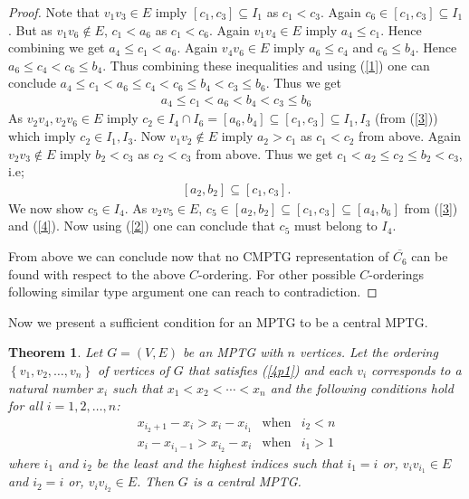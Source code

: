\documentclass{article}
\newtheorem{thm}{Theorem}[section]
\theoremstyle{definition}
\numberwithin{equation}{section}
\newcommand{\set}[1]{\left\{#1\right\}}
\begin{document}
\begin{proof}
\noindent 
Note that $v_{1}v_{3}\in E$ imply $[c_{1},c_{3}]\subseteq I_{1}$ as $c_{1}<c_{3}$. Again $c_{6}\in [c_{1},c_{3}]\subseteq I_{1}$. But as $v_{1}v_{6}\notin E$, $c_{1}<a_{6}$ as $c_{1}<c_{6}$. Again $v_{1}v_{4}\in E$ imply $a_{4}\leq c_{1}$.  Hence combining we get $a_{4}\leq c_{1}<a_{6}$. Again $v_{4}v_{6}\in E$ imply $a_{6}\leq c_{4}$ and $c_{6}\leq b_{4}$. Hence $a_{6}\leq c_{4}<c_{6}\leq b_{4}$. Thus combining these inequalities and using (\ref{1}) one can conclude
 $a_{4}\leq c_{1}<a_{6}\leq c_{4}<c_{6}\leq b_{4}<c_{3}\leq b_{6}$. Thus we get
 \begin{eqnarray}\label{3}
 a_{4}\leq c_{1}<a_{6}<b_{4}<c_{3}\leq b_{6}
\end{eqnarray}																				 
As $v_{2} v_{4}, v_{2}v_{6}\in E$ imply $c_{2}\in I_{4}\cap I_{6}=[a_{6},b_{4}]\subseteq [c_{1},c_{3}]\subseteq I_{1}, I_{3}$ (from (\ref{3})) which imply $c_{2}\in I_{1}, I_{3}$. Now $v_{1}v_{2}\notin E$ imply $a_{2}>c_{1}$ as $c_{1}<c_{2}$ from above. Again $v_{2}v_{3}\notin E$ imply $b_{2}<c_{3}$ as $c_{2}<c_{3}$ from above. Thus we get $c_{1}<a_{2}\leq c_{2}\leq b_{2}<c_{3}$, i.e; 
 \begin{eqnarray}\label{4}
 [a_{2},b_{2}]\subseteq [c_{1},c_{3}].
\end{eqnarray}
\vspace{.2em}\noindent We now show $c_{5}\in I_{4}$. As $v_{2}v_{5}\in E$, $c_{5}\in [a_{2},b_{2}]\subseteq [c_{1},c_{3}]\subseteq [a_{4},b_{6}]$ from (\ref{3}) and (\ref{4}). 
Now using (\ref{2}) one can conclude that $c_{5}$ must belong to $I_{4}$. 

\vspace*{.2 em}
\noindent From above we can conclude now that no CMPTG representation of $\overline{C_{6}}$ can be found with respect to the above $C$-ordering. For other possible $C$-orderings following similar type argument one can reach to contradiction.
\end{proof}

\noindent
Now we present a sufficient condition for an MPTG to be a central MPTG.

\begin{thm}
Let $G=(V,E)$ be an MPTG with $n$ vertices. Let the ordering $\set{v_1,v_2,\ldots,v_n}$ of vertices of $G$ that satisfies (\ref{4p1}) and each $v_i$ corresponds to a natural number $x_i$ such that $x_1<x_2<\cdots <x_n$ and the following conditions hold for all $i=1,2,\ldots,n$:
\begin{eqnarray}
x_{i_2+1}-x_i>x_i-x_{i_1} & \text{when} & i_2<n \label{cmptg2}\\
x_i-x_{i_1-1}>x_{i_2}-x_i & \text{when} & i_1>1 \label{cmptg3}
\end{eqnarray}
where $i_1$ and $i_2$ be the least and the highest indices such that $i_1=i$ or, $v_iv_{i_1}\in E$ and $i_2=i$ or, $v_iv_{i_2}\in E$. Then $G$ is a central MPTG.
\end{thm}
\end{document}
